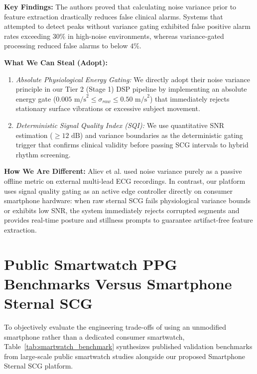 \textbf{Key Findings:} The authors proved that calculating noise variance prior to feature extraction drastically reduces false clinical alarms. Systems that attempted to detect peaks without variance gating exhibited false positive alarm rates exceeding $30\%$ in high-noise environments, whereas variance-gated processing reduced false alarms to below $4\%$.

\textbf{What We Can Steal (Adopt):}
\begin{enumerate}
    \item \textit{Absolute Physiological Energy Gating:} We directly adopt their noise variance principle in our Tier 2 (Stage 1) DSP pipeline by implementing an absolute energy gate ($0.005\text{ m/s}^2 \le \sigma_{raw} \le 0.50\text{ m/s}^2$) that immediately rejects stationary surface vibrations or excessive subject movement.
    \item \textit{Deterministic Signal Quality Index (SQI):} We use quantitative SNR estimation ($\ge 12\text{ dB}$) and variance boundaries as the deterministic gating trigger that confirms clinical validity before passing SCG intervals to hybrid rhythm screening.
\end{enumerate}

\textbf{How We Are Different:} Aliev et al. used noise variance purely as a passive offline metric on external multi-lead ECG recordings. In contrast, our platform uses signal quality gating as an active edge controller directly on consumer smartphone hardware: when raw sternal SCG fails physiological variance bounds or exhibits low SNR, the system immediately rejects corrupted segments and provides real-time posture and stillness prompts to guarantee artifact-free feature extraction.

\newpage
\section{Public Smartwatch PPG Benchmarks Versus Smartphone Sternal SCG}

To objectively evaluate the engineering trade-offs of using an unmodified smartphone rather than a dedicated consumer smartwatch, Table~\ref{tab:smartwatch_benchmark} synthesizes published validation benchmarks from large-scale public smartwatch studies alongside our proposed Smartphone Sternal SCG platform.

